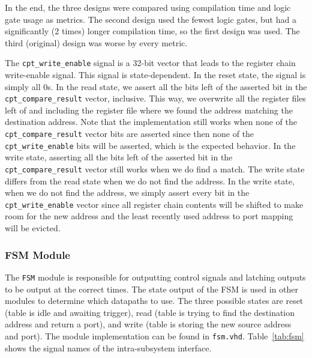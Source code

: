 \documentclass{article}
\begin{document}
In the end, the three designs were compared using compilation time and logic gate usage as metrics. The second design used the fewest logic gates, but had a significantly (2 times) longer compilation time, so the first design was used. The third (original) design was worse by every metric. 

The \texttt{cpt\_write\_enable} signal is a 32-bit vector that leads to the register chain write-enable signal. This signal is state-dependent. In the reset state, the signal is simply all 0s. In the read state, we assert all the bits left of the asserted bit in the \texttt{cpt\_compare\_result} vector, inclusive. This way, we overwrite all the register files left of and including the register file where we found the address matching the destination address. Note that the implementation still works when none of the \texttt{cpt\_compare\_result} vector bits are asserted since then none of the \texttt{cpt\_write\_enable} bits will be asserted, which is the expected behavior. In the write state, asserting all the bits left of the asserted bit in the \texttt{cpt\_compare\_result} vector still works when we do find a match. The write state differs from the read state when we do not find the address. In the write state, when we do not find the address, we simply assert every bit in the \texttt{cpt\_write\_enable} vector since all register chain contents will be shifted to make room for the new address and the least recently used address to port mapping will be evicted.

\subsubsection{FSM Module} \label{fsm}

The \texttt{FSM} module is responsible for outputting control signals and latching outputs to be output at the correct times. The state output of the FSM is used in other modules to determine which datapaths to use. The three possible states are reset (table is idle and awaiting trigger), read (table is trying to find the destination address and return a port), and write (table is storing the new source address and port). The module implementation can be found in \texttt{fsm.vhd}. Table~\ref{tab:fsm} shows the signal names of the intra-subsystem interface. 
\end{document}
